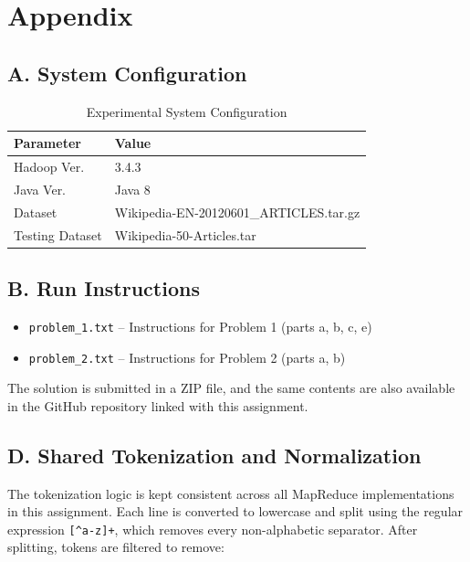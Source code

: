 \documentclass[12pt,a4paper]{article}
\begin{document}
\section*{Appendix}

\subsection*{A. System Configuration}

\begin{table}[H]
  \centering
  \renewcommand{\arraystretch}{1.4}
  \begin{tabular}{ll}
    \toprule
    \textbf{Parameter} & \textbf{Value} \\
    \midrule
    Hadoop Ver. & 3.4.3 \\
    Java Ver.   & Java 8 \\
    Dataset     & Wikipedia-EN-20120601\_ARTICLES.tar.gz \\
    Testing Dataset     & Wikipedia-50-Articles.tar \\
    \bottomrule
  \end{tabular}
  \caption{Experimental System Configuration}
\end{table}

\subsection*{B. Run Instructions}

\begin{itemize}[nosep]
  \item \texttt{problem\_1.txt} -- Instructions for Problem 1 (parts a, b, c, e)
  \item \texttt{problem\_2.txt} -- Instructions for Problem 2 (parts a, b)
\end{itemize}

The solution is submitted in a ZIP file, and the same contents are also available in the GitHub repository linked with this assignment.



\subsection*{D. Shared Tokenization and Normalization}

The tokenization logic is kept consistent across all MapReduce implementations in this assignment. Each line is converted to lowercase and split using the regular expression \verb|[^a-z]+|, which removes every non-alphabetic separator. After splitting, tokens are filtered to remove:
\end{document}
